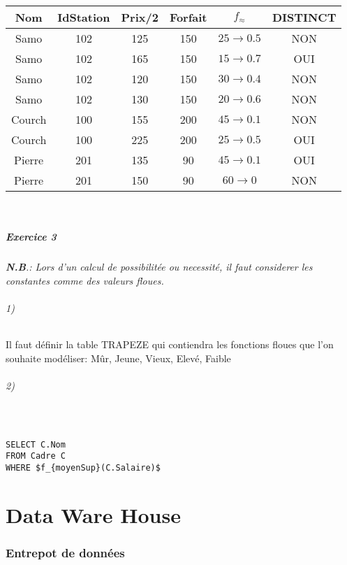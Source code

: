 \documentclass[a4paper,11pt]{article}
\begin{document}
\begin{tabular}{|c|c|c|c|c|c|}
	\hline 
	\textbf{Nom} & \textbf{IdStation} & \textbf{Prix/2} & \textbf{Forfait} & $f_{\approx}$ & \textbf{DISTINCT}\\ 
	\hline 
	\hline
	Samo & 102 & 125 & 150 & $25\rightarrow0.5$ & NON \\ 
	\hline 
	Samo & 102 & 165 & 150 & $15\rightarrow0.7$ & OUI \\ 
	\hline 
	Samo & 102 & 120 & 150 & $30\rightarrow0.4$ & NON \\ 
	\hline 
	Samo & 102 & 130 & 150 & $20\rightarrow0.6$ & NON \\ 
	\hline 
	Courch & 100 & 155 & 200 & $45\rightarrow0.1$ & NON \\ 
	\hline 
	Courch & 100 & 225 & 200 & $25\rightarrow0.5$ & OUI \\ 
	\hline 
	Pierre & 201 & 135 & 90 & $45\rightarrow0.1$ & OUI \\ 
	\hline 
	Pierre & 201 & 150 & 90 & $60\rightarrow 0$ & NON \\ 
	\hline 
\end{tabular} 
~

\subsubsection{Exercice 3}

\emph{\textbf{N.B}.: Lors d'un calcul de possibilitée ou necessité, il faut considerer les constantes comme des valeurs floues.}

\paragraph{1)} Il faut définir la table TRAPEZE qui contiendra les fonctions floues que l'on souhaite modéliser: Mûr, Jeune, Vieux, Elevé, Faible

\paragraph{2)} ~
\begin{lstlisting}[mathescape]
SELECT C.Nom
FROM Cadre C
WHERE $f_{moyenSup}(C.Salaire)$
\end{lstlisting}

\part{Data Ware House}
\section{Entrepot de données}
\end{document}
